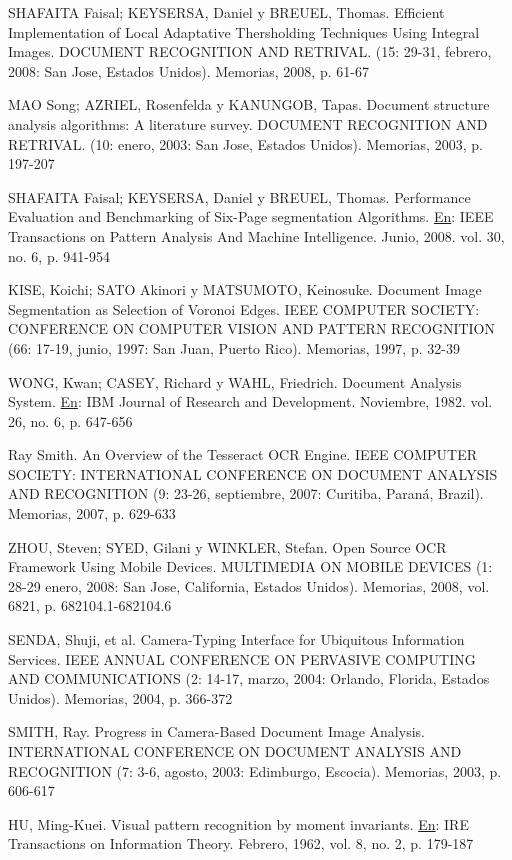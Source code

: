 \documentclass[a4paper, 12pt, oneside]{article}
\begin{document}
	SHAFAITA Faisal; KEYSERSA, Daniel y BREUEL, Thomas. Efficient Implementation of Local Adaptative Thersholding Techniques Using Integral Images. DOCUMENT RECOGNITION AND RETRIVAL. (15: 29-31, febrero, 2008: San Jose, Estados Unidos). Memorias, 2008, p. 61-67
	
	MAO Song; AZRIEL, Rosenfelda y KANUNGOB, Tapas. Document structure analysis algorithms: A literature survey. DOCUMENT RECOGNITION AND RETRIVAL. (10: enero, 2003: San Jose, Estados Unidos). Memorias, 2003, p. 197-207
	
	SHAFAITA Faisal; KEYSERSA, Daniel y BREUEL, Thomas. Performance Evaluation and Benchmarking of Six-Page segmentation Algorithms. \underline{En}: IEEE Transactions on Pattern Analysis And Machine Intelligence. Junio, 2008. vol. 30, no. 6, p. 941-954
	
	KISE, Koichi; SATO Akinori y MATSUMOTO, Keinosuke. Document Image Segmentation as Selection of Voronoi Edges. IEEE COMPUTER SOCIETY: CONFERENCE ON COMPUTER VISION AND PATTERN RECOGNITION (66: 17-19, junio, 1997: San Juan, Puerto Rico). Memorias, 1997, p. 32-39
	
	WONG, Kwan; CASEY, Richard y WAHL, Friedrich. Document Analysis System. \underline{En}: IBM Journal of Research and Development. Noviembre, 1982. vol. 26, no. 6, p. 647-656
	
	Ray Smith. An Overview of the Tesseract OCR Engine. IEEE COMPUTER SOCIETY: INTERNATIONAL CONFERENCE ON DOCUMENT ANALYSIS AND RECOGNITION (9: 23-26, septiembre, 2007: Curitiba, Paraná, Brazil). Memorias, 2007, p. 629-633
	
	ZHOU, Steven; SYED, Gilani y WINKLER, Stefan. Open Source OCR Framework Using Mobile Devices. MULTIMEDIA ON MOBILE DEVICES (1: 28-29 enero, 2008: San Jose, California, Estados Unidos). Memorias, 2008, vol. 6821, p. 682104.1-682104.6
	
	SENDA, Shuji, et al. Camera-Typing Interface for Ubiquitous Information Services. IEEE ANNUAL CONFERENCE ON PERVASIVE COMPUTING AND COMMUNICATIONS (2: 14-17, marzo, 2004: Orlando, Florida, Estados Unidos). Memorias, 2004, p. 366-372
	
	SMITH, Ray. Progress in Camera-Based Document Image Analysis. INTERNATIONAL CONFERENCE ON DOCUMENT ANALYSIS AND RECOGNITION (7: 3-6, agosto, 2003: Edimburgo, Escocia). Memorias, 2003, p. 606-617
	
	HU, Ming-Kuei. Visual pattern recognition by moment invariants. \underline{En}: IRE Transactions on Information Theory. Febrero, 1962, vol. 8, no. 2, p. 179-187
	
\end{document}
